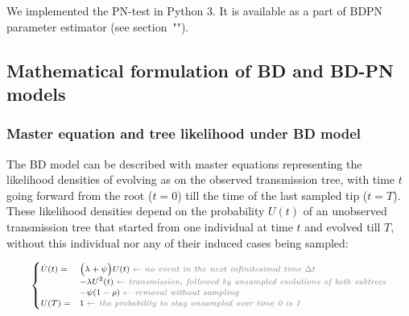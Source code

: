\documentclass[10pt,letterpaper]{article}
\begin{document}


We implemented the PN-test in Python 3. It is available as a part of BDPN parameter estimator (see section~"").

 

\subsection*{Mathematical formulation of BD and BD-PN models}\label{math}


\subsubsection*{Master equation and tree likelihood under BD model}
The BD model can be described with master equations representing the likelihood densities of evolving as on the observed transmission tree, with time $t$ going forward from the root ($t=0$) till the time of the last sampled tip ($t=T$). These likelihood densities depend on the probability $U(t)$ of an unobserved transmission tree that started from one individual at time $t$ and evolved till $T$, without this individual nor any of their induced cases being sampled: 

\begin{equation}
\scriptsize
\begin{cases}
\dot{U}(t) = &\Big(\lambda + \psi\Big) U(t)\; \textit{\color{gray} $\leftarrow$ no event in the next infinitesimal time $\Delta t$ }\\
    &- \lambda U^2(t) \;  \textit{\color{gray} $\leftarrow$ transmission, followed by unsampled evolutions of both subtrees}\\
    &- \psi (1 - \rho)\;  \textit{\color{gray} $\leftarrow$ removal without sampling}\\
U(T) = & 1\;  \textit{\color{gray} $\leftarrow$ the probability to stay unsampled over time 0 is 1} \label{eq:Us}
\end{cases}
\end{equation}
\end{document}
